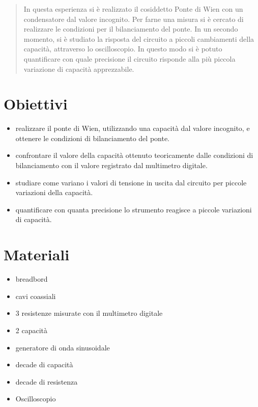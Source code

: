 \documentclass[12pt,]{article}
\begin{document}
 
	\newpage
	\renewcommand{\abstractname}{Abstract}

	\begin{abstract}
In questa esperienza si è realizzato il cosiddetto Ponte di Wien con un condensatore dal valore incognito. Per farne una misura si è cercato di realizzare le condizioni per il bilanciamento del ponte. In un secondo momento, si è studiato la risposta del circuito a piccoli cambiamenti della capacità, attraverso lo oscilloscopio. In questo modo si è potuto quantificare con quale precisione il circuito risponde alla più piccola variazione di capacità apprezzabile. 

	\end{abstract}
  \vspace{10em}
\tableofcontents
  \newpage
  \section{Obiettivi}
  \begin{itemize}
  \item realizzare il ponte di Wien, utilizzando una capacità dal valore incognito, e ottenere le condizioni di bilanciamento del ponte. 
  \item confrontare il valore della capacità ottenuto teoricamente dalle condizioni di bilanciamento con il valore registrato dal multimetro digitale. 
  \item studiare come variano i valori di tensione in uscita dal circuito per  piccole variazioni della capacità. 
  \item quantificare con quanta precisione lo strumento reagisce a piccole variazioni di capacità. 
  \end{itemize}
  
\section{Materiali}
\begin{itemize}
\item breadbord
\item cavi coassiali 
\item 3 resistenze misurate con il multimetro digitale
\item 2 capacità
\item generatore di onda sinusoidale 
\item decade di capacità
\item decade di resistenza  
\item Oscilloscopio 
\end{itemize}
\end{document}
